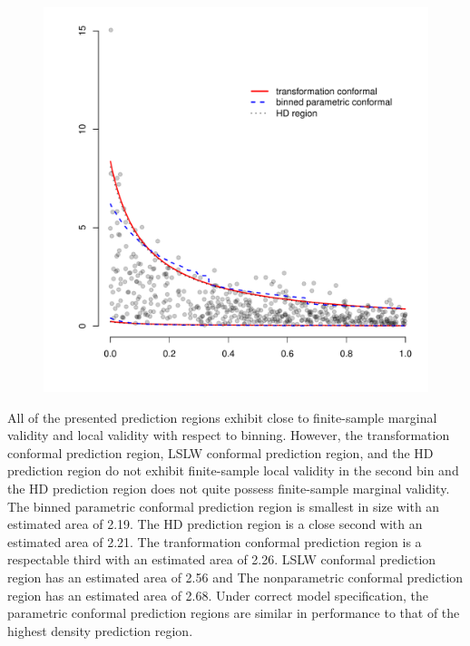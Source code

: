 \documentclass[11pt]{article}\usepackage[]{graphicx}\usepackage[]{color}
\makeatletter
\def\maxwidth{ %
  \ifdim\Gin@nat@width>\linewidth
    \linewidth
  \else
    \Gin@nat@width
  \fi
}
\newenvironment{knitrout}{}{} %
\makeatother
\begin{document}
\begin{figure}[h!]
\begin{center}
\begin{knitrout}
\color{fgcolor}
\includegraphics[width=\maxwidth]{figure/gammasimexample2-1} 

\end{knitrout}
\end{center}
\label{Fig:plots2}
\end{figure}


All of the presented prediction regions exhibit close to finite-sample 
marginal validity and local validity with respect to binning.  However, 
the transformation conformal prediction region, LSLW conformal prediction 
region, and the HD prediction region do not exhibit finite-sample local 
validity in the second bin and the HD prediction region does not quite 
possess finite-sample marginal validity.  
The binned parametric conformal prediction region is smallest in size 
with an estimated area of 2.19.  The HD prediction region is a close second 
with an estimated area of 2.21.  The tranformation conformal prediction 
region is a respectable third with an estimated area of 2.26.
LSLW conformal prediction region has an estimated area of 2.56 and 
The nonparametric conformal prediction region has an estimated area of 2.68. 
Under correct model specification, the parametric conformal prediction 
regions are similar in performance to that of the highest density prediction 
region. 
\end{document}
